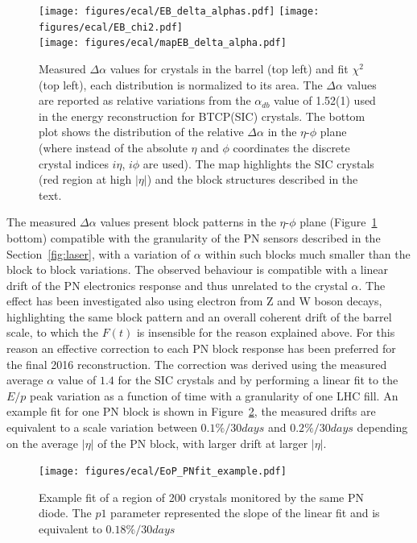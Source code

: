 \begin{figure}[h!]
  \centering
  \texttt{[image: figures/ecal/EB\_delta\_alphas.pdf]}
  \texttt{[image: figures/ecal/EB\_chi2.pdf]} \\
  \texttt{[image: figures/ecal/mapEB\_delta\_alpha.pdf]}
  \caption{Measured $\Delta\alpha$ values for crystals in the barrel (top left) and fit $\chi^2$ (top left),
    each distribution is normalized to its area.
    The $\Delta\alpha$ values are reported as relative variations from the $\alpha_{db}$ value of 1.52(1) used
    in the energy reconstruction for BTCP(SIC) crystals.
    The bottom plot shows the distribution of the relative $\Delta\alpha$ in the $\eta$-$\phi$ plane (where instead
    of the absolute $\eta$ and $\phi$ coordinates the discrete crystal indices $i\eta$, $i\phi$ are used).
    The map highlights the SIC crystals (red region at high $|\eta|$) and the block structures described in the text.}
  \label{fig:alpha_fit}
\end{figure}

The measured $\Delta\alpha$ values present block patterns in the $\eta$-$\phi$ plane (Figure~\ref{fig:alpha_fit} bottom)
compatible with the granularity of the PN sensors described in the Section~\ref{fig:laser}, with a variation of $\alpha$
within such blocks much smaller than the block to block variations. The observed behaviour is compatible with a linear drift
of the PN electronics response and thus unrelated to the crystal $\alpha$.
The effect has been investigated also using electron from Z and W boson decays, highlighting the same block pattern
and an overall coherent drift of the barrel scale, to which the $F(t)$ is insensible for the reason explained above.
For this reason an effective correction to each PN block response has been preferred for the final 2016 reconstruction.
The correction was derived using the measured average $\alpha$ value of $1.4$ for the SIC crystals and by performing
a linear fit to the $E/p$ peak variation as a function of time with a granularity of one LHC fill. An example fit for
one PN block is shown in Figure~\ref{fig:pn_fit}, the measured drifts are equivalent to a scale variation
between $0.1\% / 30 days$ and $0.2\% / 30 days$ depending on the average $|\eta|$ of the PN block, with larger drift
at larger $|\eta|$.

\begin{figure}[h!]
  \centering
  \texttt{[image: figures/ecal/EoP\_PNfit\_example.pdf]}
  \caption{Example fit of a region of 200 crystals monitored by the same PN diode. The $p1$ parameter represented
    the slope of the linear fit and is equivalent to $0.18\% / 30 days$}
  \label{fig:pn_fit}
\end{figure}


